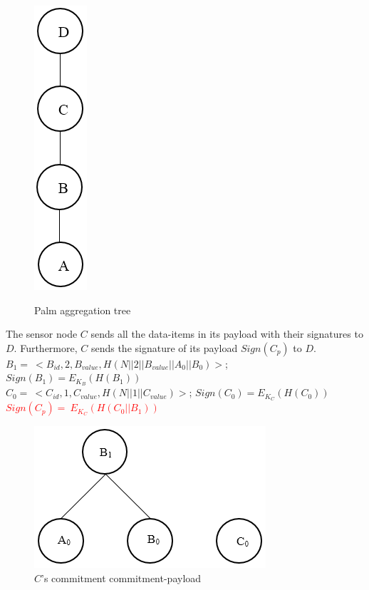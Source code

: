 			\begin{figure}[h!]
				\centering
				\includegraphics[scale = 0.5]{images/palm-aggregation-tree.png}\\
				\caption{Palm aggregation tree}
				\label{fig:Palm aggregation tree}
			\end{figure}
		The sensor node $C$ sends all the data-items in its payload with their signatures to $D$.
		Furthermore, $C$ sends the signature of its payload $Sign(C_{p})$ to $D$.\\
		$B_{1} =\ <B_{id}, 2, B_{value}, H(N||2||B_{value}||A_{0}||B_{0})>$; $Sign(B_{1}) = E_{K_{B}}(H(B_{1}))$\\
		$C_{0} =\ <C_{id}, 1, C_{value}, H(N||1||C_{value})>$; $Sign(C_{0}) = E_{K_{C}}(H(C_{0}))$\\
		\textcolor{red}{$Sign(C_{p}) =\	E_{K_{C}}(H(C_{0} || B_{1}))$}
			\begin{figure}[h!]
				\centering
				\includegraphics[scale = 0.5]{images/commitment-payload-of-C.png}
				\caption{$C$'s commitment commitment-payload}
				\label{fig:Commitment payload of C}
			\end{figure}
